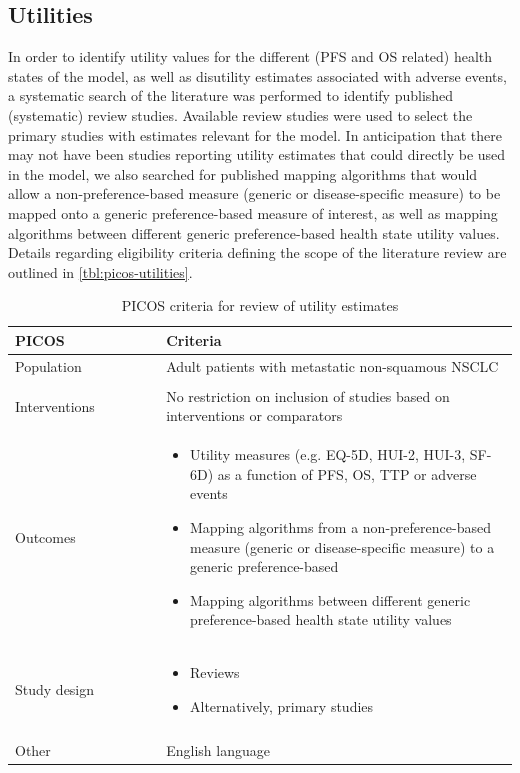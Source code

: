 \documentclass[11pt,final,fleqn]{article}\usepackage[]{graphicx}\usepackage[]{color}
\theoremstyle{plain}
\begin{document}
\begin{appendices}
\subsection{Utilities}
In order to identify utility values for the different (PFS and OS related) health states of the model, as well as disutility estimates associated with adverse events, a systematic search of the literature was performed to identify published (systematic) review studies. Available review studies were used to select the primary studies with estimates relevant for the model. In anticipation that there may not have been studies reporting utility estimates that could directly be used in the model, we also searched for published mapping algorithms that would allow a non-preference-based measure (generic or disease-specific measure) to be mapped onto a generic preference-based measure of interest, as well as mapping algorithms between different generic preference-based health state utility values. Details regarding eligibility criteria defining the scope of the literature review are outlined in \autoref{tbl:picos-utilities}. 


\begin{table}[!ht]
\begin{center}
\begin{threeparttable}
\caption{PICOS criteria for review of utility estimates} \label{tbl:picos-utilities}
\begin{tabular}{p{0.3\linewidth}p{0.7\linewidth}}
\hline
\multicolumn{1}{l}{PICOS} &  \multicolumn{1}{l}{Criteria}\\
\hline
Population & Adult patients with metastatic non-squamous NSCLC\\
&\\
Interventions & No restriction on inclusion of studies based on interventions or comparators\\
Outcomes & 
\begin{itemize}
\item Utility measures (e.g. EQ-5D, HUI-2, HUI-3, SF-6D) as a function of PFS, OS, TTP or adverse events
\item Mapping algorithms from a non-preference-based measure (generic or disease-specific measure) to a generic preference-based
\item Mapping algorithms between different generic preference-based health state utility values
\end{itemize} \\
Study design & 
\begin{itemize}
\item Reviews
\item Alternatively, primary studies
\end{itemize} \\
&\\
Other & 
English language\\
\hline
\end{tabular}
\end{threeparttable}
\end{center}
\end{table}





\end{appendices}
\end{document}
